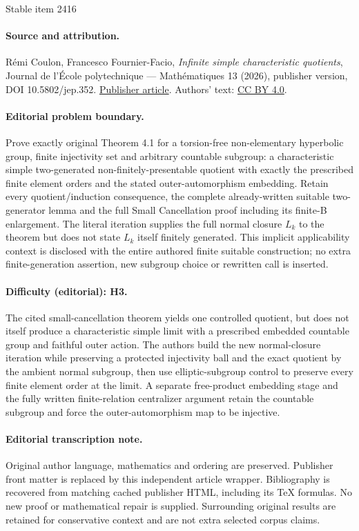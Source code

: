 \documentclass[11pt]{article}
\theoremstyle{definition}
\begin{document}
\begin{center}{\Large Stable item 2416}\end{center}
\paragraph{Source and attribution.}
Rémi Coulon, Francesco Fournier-Facio, \emph{Infinite simple characteristic quotients}, Journal de l’École polytechnique — Mathématiques 13 (2026), publisher version, DOI 10.5802/jep.352. \href{https://jep.centre-mersenne.org/articles/10.5802/jep.352/}{Publisher article}. Authors' text: \href{https://creativecommons.org/licenses/by/4.0/}{CC BY 4.0}.
\paragraph{Editorial problem boundary.}
Prove exactly original Theorem 4.1 for a torsion-free non-elementary hyperbolic group, finite injectivity set and arbitrary countable subgroup: a characteristic simple two-generated non-finitely-presentable quotient with exactly the prescribed finite element orders and the stated outer-automorphism embedding. Retain every quotient/induction consequence, the complete already-written suitable two-generator lemma and the full Small Cancellation proof including its finite-B enlargement. The literal iteration supplies the full normal closure $L_k$ to the theorem but does not state $L_k$ itself finitely generated. This implicit applicability context is disclosed with the entire authored finite suitable construction; no extra finite-generation assertion, new subgroup choice or rewritten call is inserted.
\paragraph{Difficulty (editorial): H3.}
The cited small-cancellation theorem yields one controlled quotient, but does not itself produce a characteristic simple limit with a prescribed embedded countable group and faithful outer action. The authors build the new normal-closure iteration while preserving a protected injectivity ball and the exact quotient by the ambient normal subgroup, then use elliptic-subgroup control to preserve every finite element order at the limit. A separate free-product embedding stage and the fully written finite-relation centralizer argument retain the countable subgroup and force the outer-automorphism map to be injective.
\paragraph{Editorial transcription note.}
Original author language, mathematics and ordering are preserved. Publisher front matter is replaced by this independent article wrapper. Bibliography is recovered from matching cached publisher HTML, including its TeX formulas. No new proof or mathematical repair is supplied. Surrounding original results are retained for conservative context and are not extra selected corpus claims.
\clearpage
\end{document}

